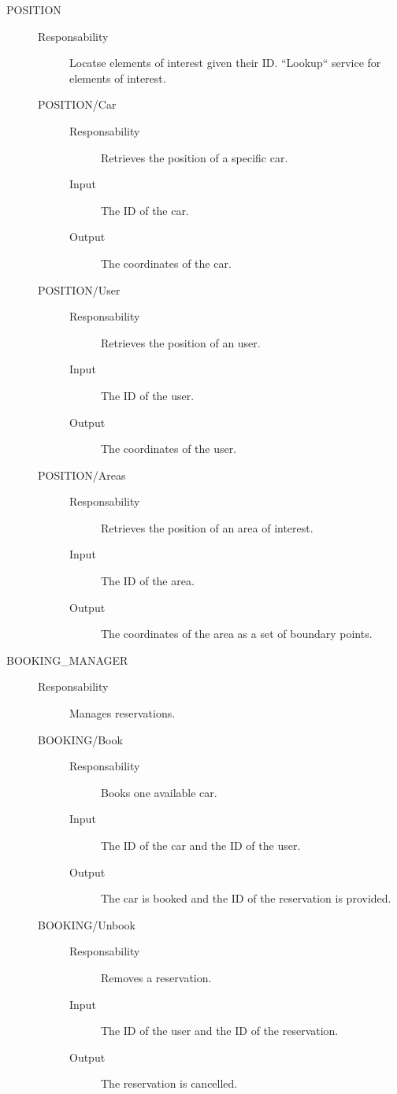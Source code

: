 \documentclass[11pt]{article} %
\begin{document}
\begin{description}
	\item[POSITION] \hfill
	\begin{description}
		\item[Responsability] Locatse elements of interest given their ID. ``Lookup`` service for elements of interest.
	\item[POSITION/Car] \hfill
		\begin{description}
			\item[Responsability] Retrieves the position of a specific car.
			\item[Input] The ID of the car.
			\item[Output] The coordinates of the car.
		\end{description}
	\item[POSITION/User] \hfill
		\begin{description}
			\item[Responsability] Retrieves the position of an user.
			\item[Input] The ID of the user.
			\item[Output] The coordinates of the user.
		\end{description}
	\item[POSITION/Areas] \hfill
		\begin{description}
			\item[Responsability]Retrieves the position of an area of interest.
			\item[Input] The ID of the area.
			\item[Output] The coordinates of the area as a set of boundary points.
		\end{description}
	\end{description}
	
	\item[BOOKING\_MANAGER] \hfill
	\begin{description}
		\item[Responsability] Manages reservations.
	\item[BOOKING/Book] \hfill
		\begin{description}
			\item[Responsability] Books one available car.
			\item[Input] The ID of the car and the ID of the user.
			\item[Output] The car is booked and the ID of the reservation is provided.
		\end{description}
	\item[BOOKING/Unbook] \hfill
		\begin{description}
			\item[Responsability] Removes a reservation.
			\item[Input] The ID of the user and the ID of the reservation.
			\item[Output] The reservation is cancelled.
		\end{description}
	\end{description}
	

\end{description}
\end{document}
